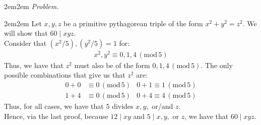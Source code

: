 \documentclass[10pt,oneside]{book}
\newcommand{\gspc}{\vspace{0.13cm}} %
\newcommand{\gline}{\gspc\\} %
\newcommand{\gmod}[1]{\,(\text{mod}\,#1)}
\let\endoldproof\endproof
\renewenvironment{proof}[1][\proofname]
  {\vspace{0.2cm}\begin{adjustwidth}{2em}{2em}
   \oldproof[#1]}
  {\endoldproof
\end{adjustwidth}}
\newenvironment{problem}[1]
  {\vspace{-0.1cm}\begin{coloredadjust}\begin{adjustwidth}{2em}{2em}
   \textit{Problem. }#1}
  {\endoldproof
\end{adjustwidth}\end{coloredadjust}\gspc}
\begin{document}
\begin{enumerate}
\begin{problem}
\begin{proof}
      Let $x,y,z$ be a primitive pythagorean triple of the form $x^2+y^2 =z^2$. We will show that $60\mid xyz$. \gline
      Consider that $(x^2/5), (y^2/5)=1$ for:
      \begin{align*}
        x^2,y^2 \equiv 0, 1, 4\gmod 5
      \end{align*}
      Thus, we have that $z^2$ must also be of the form $0, 1, 4\gmod 5$. The only possible combinations that give us that $z^2$ are:
      \begin{align*}
        0+0&\equiv 0\gmod 5  &0+1\equiv 1 \gmod 5\\
        1+4&\equiv 0 \gmod 5 &0+4\equiv 4 \gmod 5
      \end{align*}
      Thus, for all cases, we have that $5$ divides $x, y, $ or/and $z$.\gline
      Hence, via the last proof, because $12\mid xy$ and $5\mid x, y, \text{ or } z$, we have that $60\mid xyz$. 
    \end{proof}
  \end{problem}
\end{enumerate}
\end{document}
